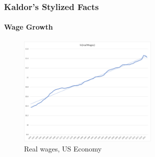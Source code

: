 \documentclass{beamer}
\begin{document}
\begin{frame}
    \frametitle{Kaldor's Stylized Facts}
    \hypertarget{wages}{} %
    \framesubtitle{Wage Growth}
        \begin{figure}
            \centering
            \includegraphics[width=0.6\textwidth]{graphs/lnwages_usa.png}
            \caption{Real wages, US Economy
            \hyperlink{kaldor}{}}

        \end{figure}
\end{frame}

\end{document}
